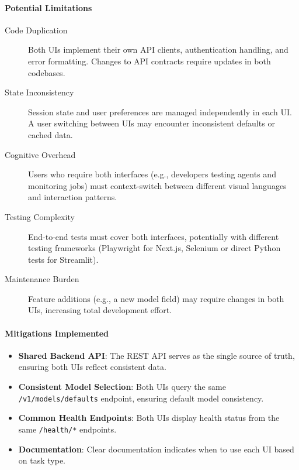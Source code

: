 \paragraph{Potential Limitations}

\begin{description}
    \item[Code Duplication] Both UIs implement their own API clients, authentication handling, and error formatting. Changes to API contracts require updates in both codebases.
    
    \item[State Inconsistency] Session state and user preferences are managed independently in each UI. A user switching between UIs may encounter inconsistent defaults or cached data.
    
    \item[Cognitive Overhead] Users who require both interfaces (e.g., developers testing agents and monitoring jobs) must context-switch between different visual languages and interaction patterns.
    
    \item[Testing Complexity] End-to-end tests must cover both interfaces, potentially with different testing frameworks (Playwright for Next.js, Selenium or direct Python tests for Streamlit).
    
    \item[Maintenance Burden] Feature additions (e.g., a new model field) may require changes in both UIs, increasing total development effort.
\end{description}

\paragraph{Mitigations Implemented}

\begin{itemize}
    \item \textbf{Shared Backend API}: The REST API serves as the single source of truth, ensuring both UIs reflect consistent data.
    \item \textbf{Consistent Model Selection}: Both UIs query the same \texttt{/v1/models/defaults} endpoint, ensuring default model consistency.
    \item \textbf{Common Health Endpoints}: Both UIs display health status from the same \texttt{/health/*} endpoints.
    \item \textbf{Documentation}: Clear documentation indicates when to use each UI based on task type.
\end{itemize}

